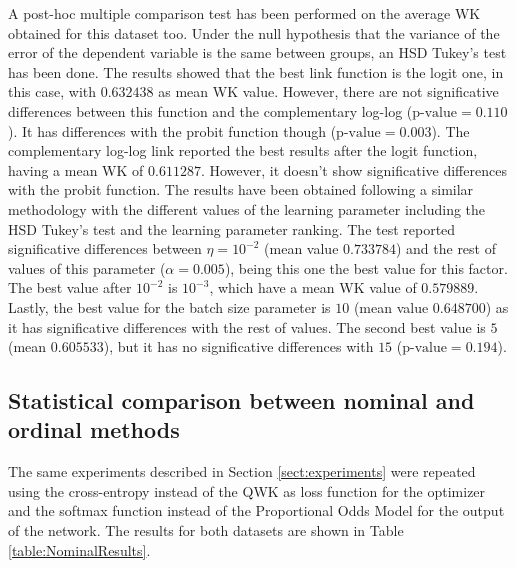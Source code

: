 \documentclass[10pt, a4paper, titlepage, twocolumn]{article}
\begin{document}
	A post-hoc multiple comparison test has been performed on the average WK obtained for this dataset too. Under the null hypothesis that the variance of the error of the dependent variable is the same between groups, an HSD Tukey's test has been done. The results showed that the best link function is the logit one, in this case, with $0.632438$ as mean WK value. However, there are not significative differences between this function and the complementary log-log ($\text{p-value}=0.110$). It has differences with the probit function though ($\text{p-value} = 0.003$). The complementary log-log link reported the best results after the logit function, having a mean WK of $0.611287$. However, it doesn't show significative differences with the probit function.
	The results have been obtained following a similar methodology with the different values of the learning parameter including the HSD Tukey's test and the learning parameter ranking. The test reported significative differences between $\eta=10^{-2}$ (mean value $0.733784$) and the rest of values of this parameter ($\alpha=0.005$), being this one the best value for this factor. The best value after $10^{-2}$ is $10^{-3}$, which have a mean WK value of $0.579889$. Lastly, the best value for the batch size parameter is $10$ (mean value $0.648700$) as it has significative differences with the rest of values. The second best value is $5$ (mean $0.605533$), but it has no significative differences with $15$ ($\text{p-value}= 0.194$).
	
	\subsection{Statistical comparison between nominal and ordinal methods}
	\label{app:NominalComparison}
	
	The same experiments described in Section \ref{sect:experiments} were repeated using the cross-entropy instead of the QWK as loss function for the optimizer and the softmax function instead of the Proportional Odds Model for the output of the network.
	The results for both datasets are shown in Table \ref{table:NominalResults}.
	
\end{document}

